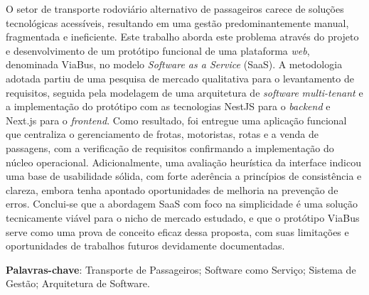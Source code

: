 \begin{resumo}
  O setor de transporte rodoviário alternativo de passageiros carece de soluções tecnológicas acessíveis, resultando em uma gestão predominantemente manual, fragmentada e ineficiente. Este trabalho aborda este problema através do projeto e desenvolvimento de um protótipo funcional de uma plataforma \textit{web}, denominada ViaBus, no modelo \textit{Software as a Service} (SaaS). A metodologia adotada partiu de uma pesquisa de mercado qualitativa para o levantamento de requisitos, seguida pela modelagem de uma arquitetura de \textit{software} \textit{multi-tenant} e a implementação do protótipo com as tecnologias NestJS para o \textit{backend} e Next.js para o \textit{frontend}. Como resultado, foi entregue uma aplicação funcional que centraliza o gerenciamento de frotas, motoristas, rotas e a venda de passagens, com a verificação de requisitos confirmando a implementação do núcleo operacional. Adicionalmente, uma avaliação heurística da interface indicou uma base de usabilidade sólida, com forte aderência a princípios de consistência e clareza, embora tenha apontado oportunidades de melhoria na prevenção de erros. Conclui-se que a abordagem SaaS com foco na simplicidade é uma solução tecnicamente viável para o nicho de mercado estudado, e que o protótipo ViaBus serve como uma prova de conceito eficaz dessa proposta, com suas limitações e oportunidades de trabalhos futuros devidamente documentadas.
  \vspace{\onelineskip}
  \noindent

  \textbf{Palavras-chave}: Transporte de Passageiros; Software como Serviço; Sistema de Gestão; Arquitetura de Software.
\end{resumo}